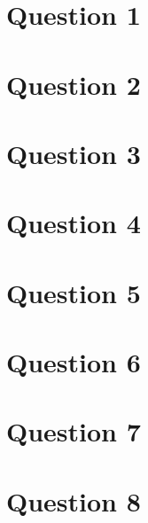 \documentclass[a4paper]{article}
\begin{document}
\lstset{style=tvnstyle}
\section{Question 1}

\section{Question 2}

\section{Question 3}

\section{Question 4}

\section{Question 5}

\section{Question 6}

\section{Question 7}

\section{Question 8}

\end{document}
